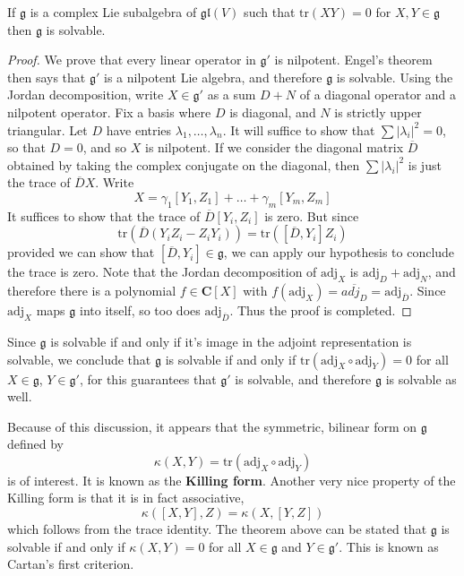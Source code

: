 \begin{theorem}
    If $\mathfrak{g}$ is a complex Lie subalgebra of $\mathfrak{gl}(V)$ such that $\text{tr}(XY) = 0$ for $X,Y \in \mathfrak{g}$ then $\mathfrak{g}$ is solvable.
\end{theorem}
\begin{proof}
    We prove that every linear operator in $\mathfrak{g}'$ is nilpotent. Engel's theorem then says that $\mathfrak{g}'$ is a nilpotent Lie algebra, and therefore $\mathfrak{g}$ is solvable. Using the Jordan decomposition, write $X \in \mathfrak{g}'$ as a sum $D + N$ of a diagonal operator and a nilpotent operator. Fix a basis where $D$ is diagonal, and $N$ is strictly upper triangular. Let $D$ have entries $\lambda_1, \dots, \lambda_n$. It will suffice to show that $\sum |\lambda_i|^2 = 0$, so that $D = 0$, and so $X$ is nilpotent. If we consider the diagonal matrix $\overline{D}$ obtained by taking the complex conjugate on the diagonal, then $\sum |\lambda_i|^2$ is just the trace of $\overline{D}X$. Write
    \[ X = \gamma_1 [Y_1, Z_1] + \dots + \gamma_m [Y_m, Z_m] \]
    It suffices to show that the trace of $\overline{D}[Y_i,Z_i]$ is zero. But since
    \[ \text{tr}(\overline{D}(Y_iZ_i - Z_iY_i)) = \text{tr}([\overline{D}, Y_i]Z_i) \]
    provided we can show that $[\overline{D},Y_i] \in \mathfrak{g}$, we can apply our hypothesis to conclude the trace is zero. Note that the Jordan decomposition of $\text{adj}_X$ is $\text{adj}_D + \text{adj}_N$, and therefore there is a polynomial $f \in \mathbf{C}[X]$ with $f(\text{adj}_X) = \overline{adj_D} = \text{adj}_{\overline{D}}$. Since $\text{adj}_X$ maps $\mathfrak{g}$ into itself, so too does $\text{adj}_{\overline{D}}$. Thus the proof is completed.
\end{proof}

Since $\mathfrak{g}$ is solvable if and only if it's image in the adjoint representation is solvable, we conclude that $\mathfrak{g}$ is solvable if and only if $\text{tr}(\text{adj}_X \circ \text{adj}_Y) = 0$ for all $X \in \mathfrak{g}$, $Y \in \mathfrak{g}'$, for this guarantees that $\mathfrak{g}'$ is solvable, and therefore $\mathfrak{g}$ is solvable as well.

Because of this discussion, it appears that the symmetric, bilinear form on $\mathfrak{g}$ defined by
%
\[ \kappa(X,Y) = \text{tr}(\text{adj}_X \circ \text{adj}_Y) \]
%
is of interest. It is known as the {\bf Killing form}. Another very nice property of the Killing form is that it is in fact associative,
%
\[ \kappa([X,Y],Z) = \kappa(X,[Y,Z]) \]
%
which follows from the trace identity. The theorem above can be stated that $\mathfrak{g}$ is solvable if and only if $\kappa(X,Y) = 0$ for all $X \in \mathfrak{g}$ and $Y \in \mathfrak{g}'$. This is known as Cartan's first criterion.

